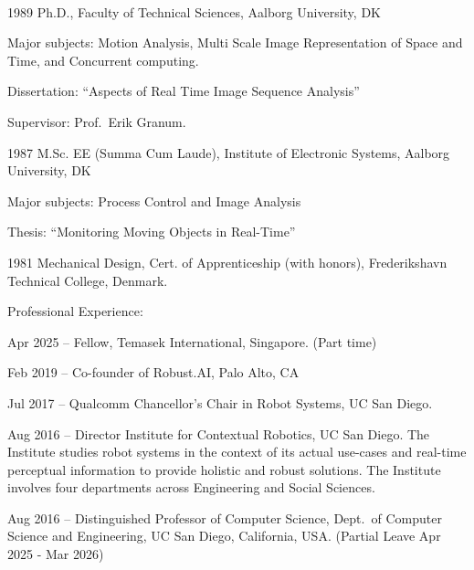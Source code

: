 \documentclass{article}
\newenvironment{sublist}{%
  \begin{list}{}{%
      \setlength{\itemsep}{0em}\setlength{\parsep}{0em}%
      \setlength{\topsep}{0em}\setlength{\parskip}{0em}%
    }%
}%
{ \end{list} }
\begin{document}
\begin{cv}
	\begin{cvlist}{~}
		\item[1989] Ph.D., Faculty of Technical Sciences, Aalborg
		University, DK
		\begin{sublist}
			\item Major subjects: Motion Analysis, Multi Scale Image
			Representation of Space and Time, and Concurrent computing.
			\item Dissertation: ``Aspects of Real Time Image Sequence Analysis''
			\item Supervisor: Prof.\ Erik Granum.
		\end{sublist}
		\item[1987] M.Sc. EE (Summa Cum Laude), Institute of Electronic
		Systems, Aalborg University, DK
		\begin{sublist}
			\item Major subjects: Process Control and Image Analysis
			\item Thesis: ``Monitoring Moving Objects in Real-Time''
		\end{sublist}
		\item[1981] Mechanical Design, Cert.
		of Apprenticeship (with honors), Frederikshavn Technical
		College, Denmark.
	\end{cvlist}



	\begin{cvlist}{Professional Experience:}
		\item[Apr 2025 --] Fellow, Temasek International, Singapore. (Part time)

		\item[Feb 2019 --] Co-founder of Robust.AI, Palo Alto, CA

		\item[Jul 2017 --] Qualcomm Chancellor's Chair in Robot Systems, UC San Diego.

		\item[Aug 2016 --] Director Institute for Contextual Robotics, UC San
		Diego. The Institute studies robot systems in the context of its
		actual use-cases and real-time perceptual information to provide
		holistic and robust solutions. The Institute involves four
		departments across Engineering and Social Sciences.

		\item[Aug 2016 --] Distinguished Professor of Computer Science, Dept.\ of
		Computer Science and Engineering, UC San Diego, California, USA.\@
		(Partial Leave Apr 2025 - Mar 2026)


\end{cvlist}
\end{cv}
\end{document}
